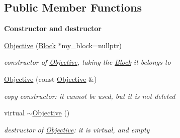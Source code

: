 \subsection*{Public Member Functions}
\begin{Indent}\textbf{ Constructor and destructor}\par
\begin{DoxyCompactItemize}
\item 
\mbox{\hyperlink{class_s_m_spp__di__unipi__it_1_1_objective_a27af263cb52b39bdee207cff5c4ba18e}{Objective}} (\mbox{\hyperlink{class_s_m_spp__di__unipi__it_1_1_block}{Block}} $\ast$my\+\_\+block=nullptr)
\begin{DoxyCompactList}\small\item\em constructor of \mbox{\hyperlink{class_s_m_spp__di__unipi__it_1_1_objective}{Objective}}, taking the \mbox{\hyperlink{class_s_m_spp__di__unipi__it_1_1_block}{Block}} it belongs to \end{DoxyCompactList}\item 
\mbox{\hyperlink{class_s_m_spp__di__unipi__it_1_1_objective_ae1772e2e5d238495aef316dc74e10b35}{Objective}} (const \mbox{\hyperlink{class_s_m_spp__di__unipi__it_1_1_objective}{Objective}} \&)
\begin{DoxyCompactList}\small\item\em copy constructor\+: it cannot be used, but it is not deleted \end{DoxyCompactList}\item 
\mbox{\label{class_s_m_spp__di__unipi__it_1_1_objective_aff8904fa829562e678b8220f8b580075}} 
virtual \mbox{\hyperlink{class_s_m_spp__di__unipi__it_1_1_objective_aff8904fa829562e678b8220f8b580075}{$\sim$\+Objective}} ()
\begin{DoxyCompactList}\small\item\em destructor of \mbox{\hyperlink{class_s_m_spp__di__unipi__it_1_1_objective}{Objective}}\+: it is virtual, and empty \end{DoxyCompactList}\end{DoxyCompactItemize}
\end{Indent}
